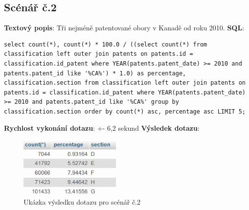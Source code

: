 \subsection{Scénář č.2}
\textbf{Textový popis}: Tři nejméně patentované obory v Kanadě od roku 2010.
\newline
\textbf{SQL}: 
\begin{lstlisting}[label = {lst:elements_a}]
select count(*), count(*) * 100.0 / ((select count(*) from classification left outer join patents on patents.id = classification.id_patent where YEAR(patents.patent_date) >= 2010 and patents.patent_id like '%CA%') * 1.0) as percentage, classification.section from classification left outer join patents on patents.id = classification.id_patent where YEAR(patents.patent_date) >= 2010 and patents.patent_id like '%CA%' group by classification.section order by count(*) asc, percentage asc LIMIT 5;
\end{lstlisting}
\textbf{Rychlost vykonání dotazu}: +- 6,2 sekund
\newline
\textbf{Výsledek dotazu}:
\begin{figure}[H]
\centering
\includegraphics[width=5cm]{img/scenare/scenar_2}
\caption{Ukázka výsledku dotazu pro scénář č.2}
\label{fig:scenar2}
\end{figure}

